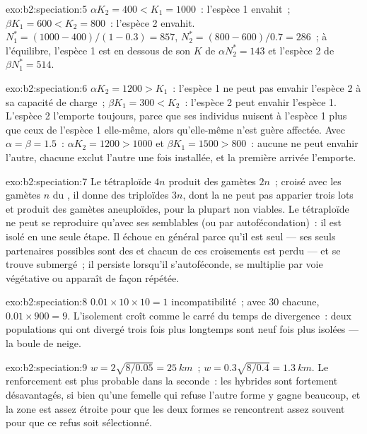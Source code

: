 \begin{solution}{exo:b2:speciation:5}
$\alpha K_2 = 400 < K_1 = 1000$~: l'espèce 1 envahit~; $\beta K_1 = 600
< K_2 = 800$~: l'espèce 2 envahit. $N_1^{*} = (1000 - 400)/(1 - 0.3) =
857$, $N_2^{*} = (800 - 600)/0.7 = 286$~; à l'équilibre, l'espèce
1 est en dessous de son $K$ de $\alpha N_2^{*} = 143$ et l'espèce 2 de $\beta
N_1^{*} = 514$.
\end{solution}

\begin{solution}{exo:b2:speciation:6}
$\alpha K_2 = 1200 > K_1$~: l'espèce 1 ne peut pas envahir l'espèce 2 à
sa capacité de charge~; $\beta K_1 = 300 < K_2$~: l'espèce 2 peut envahir
l'espèce 1. L'espèce 2 l'emporte toujours, parce que ses individus nuisent
à l'espèce 1 plus que ceux de l'espèce 1 elle-même, alors qu'elle-même
n'est guère affectée. Avec $\alpha = \beta = 1.5$~: $\alpha K_2 = 1200 > 1000$
et $\beta K_1 = 1500 > 800$~: aucune ne peut envahir l'autre, chacune
exclut l'autre une fois installée, et la première arrivée l'emporte.
\end{solution}

\begin{solution}{exo:b2:speciation:7}
Le tétraploïde $4n$ produit des gamètes $2n$~; croisé avec les gamètes $n$
du , il donne des triploïdes $3n$, dont la  ne peut pas
apparier trois lots et produit des gamètes aneuploïdes, pour la plupart
non viables. Le
tétraploïde ne peut se reproduire qu'avec ses semblables (ou par
autofécondation)~: il est isolé en une seule étape. Il échoue en général
parce qu'il est seul --- ses seuls partenaires possibles sont des
 et chacun de ces croisements est perdu --- et se trouve
submergé~; il persiste lorsqu'il s'autoféconde, se multiplie par voie
végétative ou apparaît de façon répétée.
\end{solution}

\begin{solution}{exo:b2:speciation:8}
$0.01\times 10\times 10 = 1$ incompatibilité~; avec 30 chacune, $0.01\times
900 = 9$. L'isolement croît comme le carré du temps de divergence~: deux
populations qui ont divergé trois fois plus longtemps sont neuf fois plus
isolées --- la boule de neige.
\end{solution}

\begin{solution}{exo:b2:speciation:9}
$w = 2\sqrt{8/0.05} = \qty{25}{km}$~; $w = 0.3\sqrt{8/0.4} =
\qty{1.3}{km}$. Le renforcement est plus probable dans la seconde~: les
hybrides sont fortement désavantagés, si bien qu'une femelle qui refuse
l'autre forme y gagne beaucoup, et la zone est assez étroite pour que les
deux formes se rencontrent assez souvent pour que ce refus soit
sélectionné.
\end{solution}

